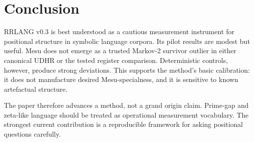 \documentclass[11pt,a4paper]{article}
\newcommand{\RRLANG}{\textsc{RRLANG}}
\begin{document}
\section{Conclusion}
\RRLANG{} v0.3 is best understood as a cautious measurement instrument for positional structure in symbolic language corpora. Its pilot results are modest but useful. Mesu does not emerge as a trusted Markov-2 survivor outlier in either canonical UDHR or the tested register comparison. Deterministic controls, however, produce strong deviations. This supports the method's basic calibration: it does not manufacture desired Mesu-specialness, and it is sensitive to known artefactual structure.

The paper therefore advances a method, not a grand origin claim. Prime-gap and zeta-like language should be treated as operational measurement vocabulary. The strongest current contribution is a reproducible framework for asking positional questions carefully.
\end{document}

